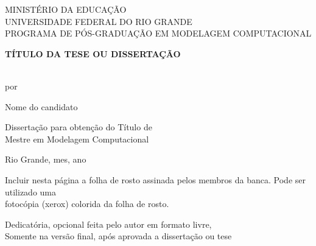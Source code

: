 \documentclass[a4paper,12pt,oneside]{article}
\numberwithin{equation}{section}
\begin{document}
\onehalfspacing
\pagestyle{myheadings}

\thispagestyle{empty}
\begin{center}

MINISTÉRIO DA EDUCAÇÃO\\
UNIVERSIDADE FEDERAL DO RIO GRANDE\\
PROGRAMA DE PÓS-GRADUAÇÃO EM MODELAGEM COMPUTACIONAL\\
\vspace*{2.5cm}

\vspace{3cm}
\begin{large}
\textbf{\uppercase{
	Título da tese ou dissertação
}}
\end{large}
\vspace*{2cm}\\por\vspace*{2cm}

Nome do candidato

\vspace*{2.5cm}
Dissertação para obtenção do Título de\\
Mestre em Modelagem Computacional

\vspace{6cm}Rio Grande, mes, ano

\end{center}



\newpage
\thispagestyle{empty}


Incluir nesta página a folha de rosto assinada pelos membros da banca. Pode ser utilizado uma\\
fotocópia (xerox) colorida da folha de rosto.


\newpage
\thispagestyle{empty}
\begin{flushright}\vspace*{5cm}

Dedicatória, opcional feita pelo autor em formato livre,\\
Somente na versão final, após aprovada a dissertação ou tese\\

\end{flushright}
\end{document}

